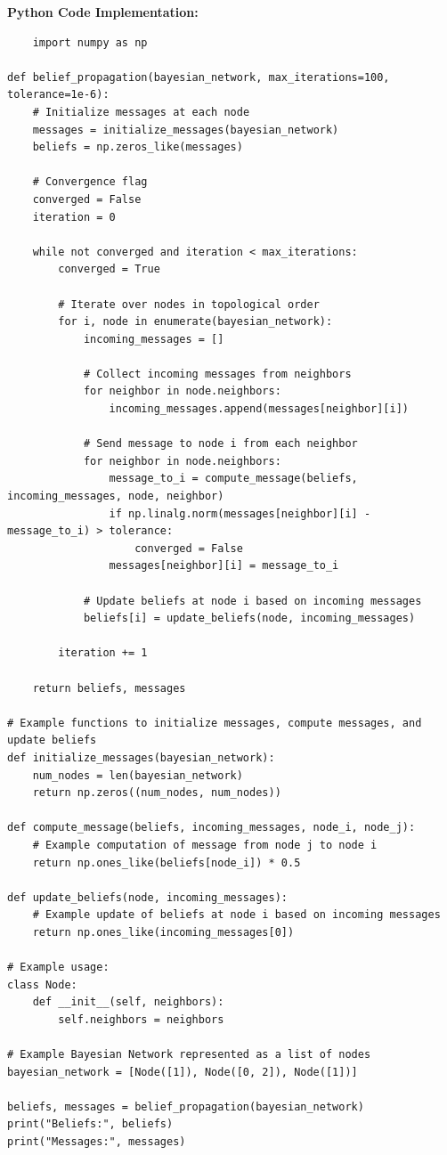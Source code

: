 \documentclass[12pt]{book} %
\begin{document}
\textbf{Python Code Implementation:}
\FloatBarrier
\begin{lstlisting}
    import numpy as np

def belief_propagation(bayesian_network, max_iterations=100, tolerance=1e-6):
    # Initialize messages at each node
    messages = initialize_messages(bayesian_network)
    beliefs = np.zeros_like(messages)
    
    # Convergence flag
    converged = False
    iteration = 0
    
    while not converged and iteration < max_iterations:
        converged = True
        
        # Iterate over nodes in topological order
        for i, node in enumerate(bayesian_network):
            incoming_messages = []
            
            # Collect incoming messages from neighbors
            for neighbor in node.neighbors:
                incoming_messages.append(messages[neighbor][i])
            
            # Send message to node i from each neighbor
            for neighbor in node.neighbors:
                message_to_i = compute_message(beliefs, incoming_messages, node, neighbor)
                if np.linalg.norm(messages[neighbor][i] - message_to_i) > tolerance:
                    converged = False
                messages[neighbor][i] = message_to_i
            
            # Update beliefs at node i based on incoming messages
            beliefs[i] = update_beliefs(node, incoming_messages)
        
        iteration += 1
    
    return beliefs, messages

# Example functions to initialize messages, compute messages, and update beliefs
def initialize_messages(bayesian_network):
    num_nodes = len(bayesian_network)
    return np.zeros((num_nodes, num_nodes))

def compute_message(beliefs, incoming_messages, node_i, node_j):
    # Example computation of message from node j to node i
    return np.ones_like(beliefs[node_i]) * 0.5

def update_beliefs(node, incoming_messages):
    # Example update of beliefs at node i based on incoming messages
    return np.ones_like(incoming_messages[0])

# Example usage:
class Node:
    def __init__(self, neighbors):
        self.neighbors = neighbors

# Example Bayesian Network represented as a list of nodes
bayesian_network = [Node([1]), Node([0, 2]), Node([1])]

beliefs, messages = belief_propagation(bayesian_network)
print("Beliefs:", beliefs)
print("Messages:", messages)
\end{lstlisting}
\end{document}
